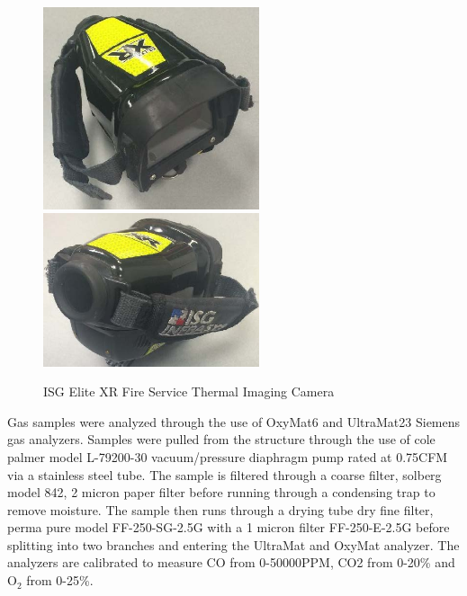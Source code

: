 \documentclass{article}
\begin{document}
\begin{figure} [H]
	\centering
	\includegraphics[width = 2.5in]{0_Images/Instrumentation/ISG_IR.jpg}
	\includegraphics[width = 2.5in]{0_Images/Instrumentation/ISG_IR2.jpg}
	\caption{ISG Elite XR Fire Service Thermal Imaging Camera}
	\label{fig:IRCam}
\end{figure}

Gas samples were analyzed through the use of OxyMat6 and UltraMat23 Siemens gas analyzers. Samples were pulled from the structure through the use of cole palmer model L-79200-30 vacuum/pressure diaphragm pump rated at 0.75CFM via a stainless steel tube. The sample is filtered through a coarse filter, solberg model 842, 2 micron paper filter before running through a condensing trap to remove moisture. The sample then runs through a drying tube dry fine filter, perma pure model FF-250-SG-2.5G with a 1 micron filter FF-250-E-2.5G before splitting into two branches and entering the UltraMat and OxyMat analyzer. The analyzers are calibrated to measure CO from 0-50000PPM, CO2 from 0-20\% and O$_2$ from 0-25\%. 
\end{document}
